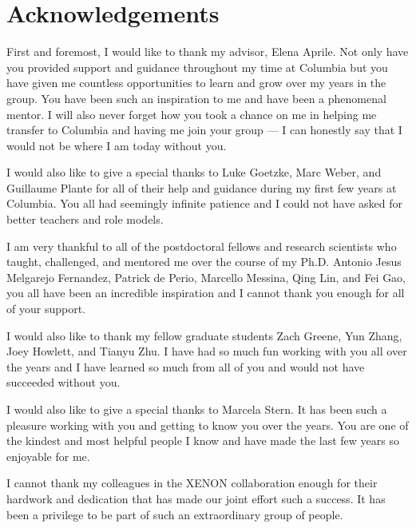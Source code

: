 
\cleartorecto %
\chapter{Acknowledgements} %
\thispagestyle{plain} %



First and foremost, I would like to thank my advisor, Elena Aprile.  Not only have you provided support and guidance throughout my time at Columbia but you have given me countless opportunities to learn and grow over my years in the group.  You have been such an inspiration to me and have been a phenomenal mentor.  I will also never forget how you took a chance on me in helping me transfer to Columbia and having me join your group --- I can honestly say that I would not be where I am today without you.


I would also like to give a special thanks to Luke Goetzke, Marc Weber, and Guillaume Plante for all of their help and guidance during my first few years at Columbia.  You all had seemingly infinite patience and I could not have asked for better teachers and role models.


I am very thankful to all of the postdoctoral fellows and research scientists who taught, challenged, and mentored me over the course of my Ph.D.  Antonio Jesus Melgarejo Fernandez, Patrick de Perio, Marcello Messina, Qing Lin, and Fei Gao, you all have been an incredible inspiration and I cannot thank you enough for all of your support.  


I would also like to thank my fellow graduate students Zach Greene, Yun Zhang, Joey Howlett, and Tianyu Zhu.  I have had so much fun working with you all over the years and I have learned so much from all of you and would not have succeeded without you.  


I would also like to give a special thanks to Marcela Stern.  It has been such a pleasure working with you and getting to know you over the years.  You are one of the kindest and most helpful people I know and have made the last few years so enjoyable for me.


I cannot thank my colleagues in the XENON collaboration enough for their hardwork and dedication that has made our joint effort such a success.  It has been a privilege to be part of such an extraordinary group of people.


